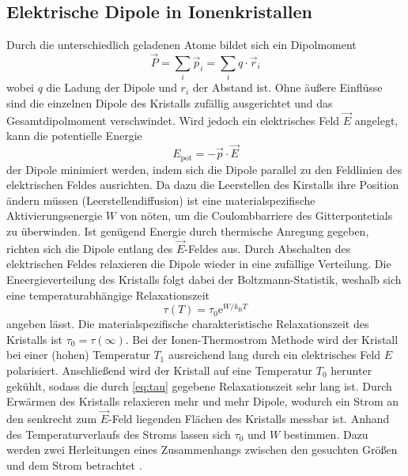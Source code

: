 \subsection{Elektrische Dipole in Ionenkristallen}
Durch die unterschiedlich geladenen Atome bildet sich ein Dipolmoment
\begin{equation*}
    \vec{P} = \sum_i \vec{p}_i = \sum_i q \cdot \vec{r}_i
\end{equation*}
wobei $q$ die Ladung der Dipole und $r_i$ der Abstand ist. Ohne äußere Einflüsse sind die einzelnen Dipole des Kristalls zufällig ausgerichtet und das Gesamtdipolmoment verschwindet.
Wird jedoch ein elektrisches Feld $\vec{E}$ angelegt, kann die potentielle Energie 
\begin{equation*}
    E_\text{pot} = -\vec{p} \cdot \vec{E}
\end{equation*}     
der Dipole minimiert werden, indem sich die Dipole parallel zu den Feldlinien des elektrischen Feldes ausrichten. Da dazu die Leerstellen des Kirstalls ihre Position ändern müssen 
(Leerstellendiffusion) ist eine materialspezifische Aktivierungsenergie $W$ von nöten, um die Coulombbarriere des Gitterpontetials zu überwinden. 
Ist genügend Energie durch thermische Anregung gegeben, richten sich die Dipole entlang des $\vec{E}$-Feldes aus. Durch Abschalten des elektrischen Feldes relaxieren die Dipole 
wieder in eine zufällige Verteilung. Die Eneergieverteilung des Kristalls folgt dabei der Boltzmann-Statistik, weshalb sich eine temperaturabhängige Relaxationszeit 
\begin{equation}
    \label{eq:tau}
    \tau(T) = \tau_0 \mathrm{e}^{W/k_\text{B}T}
\end{equation}
angeben lässt. Die materialspezifische charakteristische Relaxationszeit des Kristalls ist $\tau_0 = \tau(\infty)$. 
Bei der Ionen-Thermostrom Methode wird der Kristall bei einer (hohen) Temperatur $T_1$ ausreichend lang durch ein elektrisches Feld $E$ polarisiert. 
Anschließend wird der Kristall auf eine Temperatur $T_0$ 
herunter gekühlt, sodass die durch \autoref{eq:tau} gegebene Relaxationszeit sehr lang ist. Durch Erwärmen des Kristalls relaxieren mehr und mehr Dipole, 
wodurch ein Strom an den senkrecht zum
$\vec{E}$-Feld liegenden Flächen des Kristalls messbar ist. Anhand des Temperaturverlaufs des Stroms lassen sich $\tau_0$ und $W$ bestimmen. 
Dazu werden zwei Herleitungen eines Zusammenhangs zwischen den gesuchten Größen und dem Strom betrachtet \cite{Fuller1972}.


